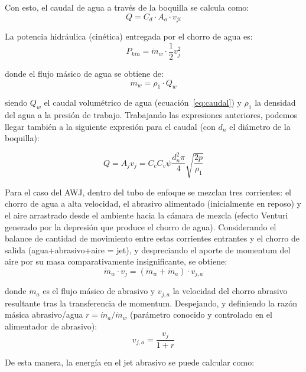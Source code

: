 Con esto, el caudal de agua a través de la boquilla se calcula como:
\begin{equation}
	Q = C_d \cdot A_o \cdot v_{ji}
	\label{eq:caudal}
\end{equation}

La potencia hidráulica (cinética) entregada por el chorro de agua es:
\begin{equation}
	P_{kin} = \dot{m}_w \cdot \frac{1}{2}v_j^2
	\label{eq:pkin}
\end{equation}

donde el flujo másico de agua se obtiene de:
\begin{equation}
	\dot{m}_w = \rho_1 \cdot Q_w
	\label{eq:mdot}
\end{equation}

siendo $Q_w$ el caudal volumétrico de agua (ecuación~\eqref{eq:caudal}) y $\rho_1$ la densidad del agua a la presión de trabajo. Trabajando las expresiones anteriores, podemos llegar también a la siguiente expresión para el caudal (con $d_{n}$ el diámetro de la boquilla):

\begin{equation}
	Q=A_{j}v_{j}=C_{c}C_{v}\psi \frac{d_{n}^{2}\pi}{4}\sqrt{\frac{2p }{\rho_{1}}}
\end{equation}

Para el caso del AWJ, dentro del tubo de enfoque se mezclan tres corrientes: el chorro de agua a alta velocidad, el abrasivo alimentado (inicialmente en reposo) y el aire arrastrado desde el ambiente hacia la cámara de mezcla (efecto Venturi generado por la depresión que produce el chorro de agua). Considerando el balance de cantidad de movimiento entre estas corrientes entrantes y el chorro de salida (agua+abrasivo+aire = jet), y despreciando el aporte de momentum del aire por su masa comparativamente insignificante, se obtiene:
\begin{equation}
	\dot{m}_w \cdot v_j = (\dot{m}_w + \dot{m}_a)\cdot v_{j,a}
	\label{eq:momentum}
\end{equation}

donde $\dot m_a$ es el flujo másico de abrasivo y $v_{j,a}$ la velocidad del chorro abrasivo resultante tras la transferencia de momentum. Despejando, y definiendo la razón másica abrasivo/agua $r=\dot m_a/\dot m_w$ (parámetro conocido y controlado en el alimentador de abrasivo):
\begin{equation}
	v_{j,a} = \frac{v_j}{1+r}
	\label{eq:vja}
\end{equation}

De esta manera, la energía en el jet abrasivo se puede calcular como:


